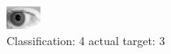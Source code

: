 \begin{figure}[h!]
\begin{center}
\includegraphics[width=0.60\columnwidth]{figures/ID228_class_4_target_3.png}
\end{center}
\caption{ Classification: 4 actual target: 3}
\label{fig:ID228_class_4_target_3}
\end{figure}
